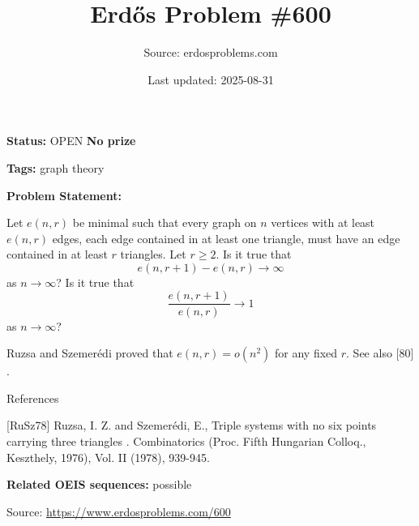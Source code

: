 \documentclass{article}
\title{Erd\H{o}s Problem \#600}
\date{Last updated: 2025-08-31}
\author{Source: erdosproblems.com}
\begin{document}
\maketitle

\noindent\textbf{Status:} OPEN \quad \textbf{No prize}

\noindent\textbf{Tags:} graph theory

\medskip

\noindent\textbf{Problem Statement:}

Let $e(n,r)$ be minimal such that every graph on $n$ vertices with at least $e(n,r)$ edges, each edge contained in at least one triangle, must have an edge contained in at least $r$ triangles. Let $r\geq 2$. Is it true that\[e(n,r+1)-e(n,r)\to \infty\]as $n\to \infty$? Is it true that\[\frac{e(n,r+1)}{e(n,r)}\to 1\]as $n\to \infty$?




Ruzsa and Szemer\'{e}di \cite{RuSz78} proved that $e(n,r)=o(n^2)$ for any fixed $r$. See also [80] .




References

[RuSz78] Ruzsa, I. Z. and Szemer\'{e}di, E., Triple systems with no six points carrying three triangles . Combinatorics (Proc. Fifth Hungarian Colloq., Keszthely, 1976), Vol. II (1978), 939-945.

\noindent\textbf{Related OEIS sequences:} possible


\bigskip
\noindent\small{Source: \url{https://www.erdosproblems.com/600}}
\end{document}
